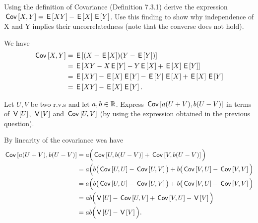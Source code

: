 \documentclass[assignments]{subfiles}
\begin{document}
\begin{exercise}
Using the definition of Covariance (Definition 7.3.1) derive the expression $\cov{X,Y}=\E{XY}-\E{X}\E{Y}$. Use this finding to show why independence of X and Y implies their uncorrelatedness (note that the converse does not hold).
\begin{solution}
We have
\begin{align}
    \cov{X,Y} &= \E{(X - \E{X})(Y - \E{Y})} \\
    &= \E{XY - X\E{Y} - Y\E{X} + \E{X}\E{Y}} \\
    &= \E{XY} - \E{X}\E{Y} - \E{Y} \E{X} + \E{X}\E{Y}\\
    &= \E{XY}-\E{X}\E{Y}.
\end{align}

\end{solution}
\end{exercise}

\begin{exercise}
Let $U, V$ be two r.v.s and let $a,b\in \R$.
Express $\cov{a(U+V), b(U-V)}$ in terms of $\V{U}$, $\V{V}$ and $\cov{U,V}$ (by using the expression obtained in the previous question).
\begin{solution}
By linearity of the covariance wea have
\begin{align}
    \cov{a(U+V), b(U-V)} &= a \Big( \cov{U, b(U-V)} + \cov{V, b(U-V)} \Big) \\
    &= a \Big( b\big( \cov{U, U} - \cov{U, V} \big)  + b\big( \cov{V, U} - \cov{V,V} \Big) \\
    &= a \Big( b\big( \cov{U, U} - \cov{U, V} \big)  + b\big( \cov{V, U} - \cov{V,V} \Big) \\
    &= a b \Big( \V{U} - \cov{U, V} + \cov{V, U} - \V{V} \Big) \\
    &= a b \Big( \V{U} - \V{V} \Big).
\end{align}
\end{solution}
\end{exercise}
\end{document}
